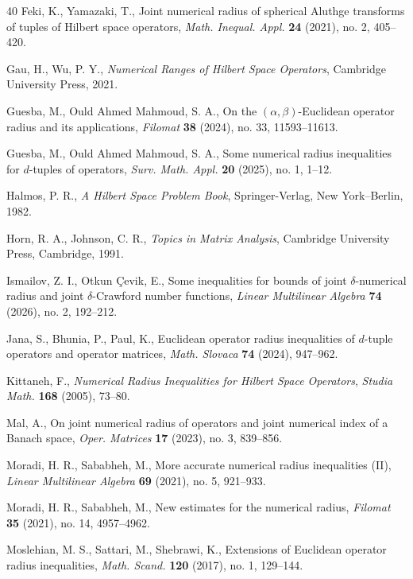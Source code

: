 \documentclass[12pt]{article}
\begin{document}
\begin{thebibliography}{40}
Feki, K., Yamazaki, T.,
Joint numerical radius of spherical Aluthge transforms of tuples of Hilbert space operators,
\emph{Math. Inequal. Appl.} \textbf{24} (2021), no. 2, 405--420.

Gau, H., Wu, P. Y.,
\emph{Numerical Ranges of Hilbert Space Operators},
Cambridge University Press, 2021.

Guesba, M., Ould Ahmed Mahmoud, S. A.,
On the $(\alpha,\beta)$-Euclidean operator radius and its applications,
\emph{Filomat} \textbf{38} (2024), no. 33, 11593--11613.

Guesba, M., Ould Ahmed Mahmoud, S. A.,
Some numerical radius inequalities for $d$-tuples of operators,
\emph{Surv. Math. Appl.} \textbf{20} (2025), no. 1, 1--12.

Halmos, P. R.,
\emph{A Hilbert Space Problem Book},
Springer-Verlag, New York--Berlin, 1982.

Horn, R. A., Johnson, C. R.,
\emph{Topics in Matrix Analysis},
Cambridge University Press, Cambridge, 1991.

Ismailov, Z. I., Otkun Çevik, E.,
Some inequalities for bounds of joint $\delta$-numerical radius and joint $\delta$-Crawford number functions,
\emph{Linear Multilinear Algebra} \textbf{74} (2026), no. 2, 192--212.

Jana, S., Bhunia, P., Paul, K.,
Euclidean operator radius inequalities of $d$-tuple operators and operator matrices,
\emph{Math. Slovaca} \textbf{74} (2024), 947--962.

Kittaneh, F.,
\emph{Numerical Radius Inequalities for Hilbert Space Operators},
\emph{Studia Math.} \textbf{168} (2005), 73--80.

Mal, A.,
On joint numerical radius of operators and joint numerical index of a Banach space,
\emph{Oper. Matrices} \textbf{17} (2023), no. 3, 839--856.

Moradi, H. R., Sababheh, M.,
More accurate numerical radius inequalities (II),
\emph{Linear Multilinear Algebra} \textbf{69} (2021), no. 5, 921--933.

Moradi, H. R., Sababheh, M.,
New estimates for the numerical radius,
\emph{Filomat} \textbf{35} (2021), no. 14, 4957--4962.

Moslehian, M. S., Sattari, M., Shebrawi, K.,
Extensions of Euclidean operator radius inequalities,
\emph{Math. Scand.} \textbf{120} (2017), no. 1, 129--144.


\end{thebibliography}
\end{document}
